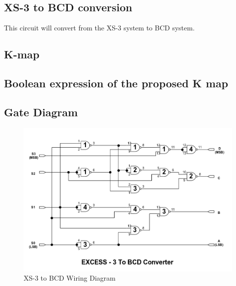 \documentclass[11pt,a4paper]{article}
\begin{document}
\subsection{XS-3 to BCD conversion}
This circuit will convert from the XS-3 system to BCD system.
\subsection{K-map}
\subsection{Boolean expression of the proposed K map}
\subsection{Gate Diagram}
\begin{figure}[H]
    \centering
    \includegraphics[width=7in]{XS3-BCD.png}
    \caption{XS-3 to BCD Wiring Diagram}
\end{figure}
\end{document}
